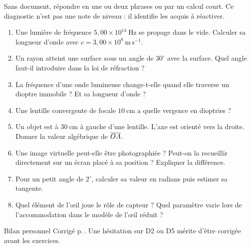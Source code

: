Sans document, répondre en une ou deux phrases ou par un calcul court. Ce diagnostic n'est pas une note de niveau : il identifie les acquis à réactiver.
\begin{enumerate}[label=\textcolor{otNavy}{\bfseries D\arabic*.},itemsep=5mm]
\item Une lumière de fréquence $5{,}00\times10^{14}\ \mathrm{Hz}$ se propage dans le vide. Calculer sa longueur d'onde avec $c=3{,}00\times10^8\ \mathrm{m\,s^{-1}}$.
\item Un rayon atteint une surface sous un angle de $30^\circ$ avec la surface. Quel angle faut-il introduire dans la loi de réfraction ?
\item La fréquence d'une onde lumineuse change-t-elle quand elle traverse un dioptre immobile ? Et sa longueur d'onde ?
\item Une lentille convergente de focale $10\ \mathrm{cm}$ a quelle vergence en dioptries ?
\item Un objet est à $30\ \mathrm{cm}$ à gauche d'une lentille. L'axe est orienté vers la droite. Donner la valeur algébrique de $\overline{OA}$.
\item Une image virtuelle peut-elle être photographiée ? Peut-on la recueillir directement sur un écran placé à sa position ? Expliquer la différence.
\item Pour un petit angle de $2^\circ$, calculer sa valeur en radians puis estimer sa tangente.
\item Quel élément de l'œil joue le rôle de capteur ? Quel paramètre varie lors de l'accommodation dans le modèle de l'œil réduit ?
\end{enumerate}
\begin{docu}{Bilan personnel}
Corrigé p.\,\pageref{corr-diag}. Une hésitation sur D2 ou D5 mérite d'être corrigée avant les exercices.
\end{docu}
